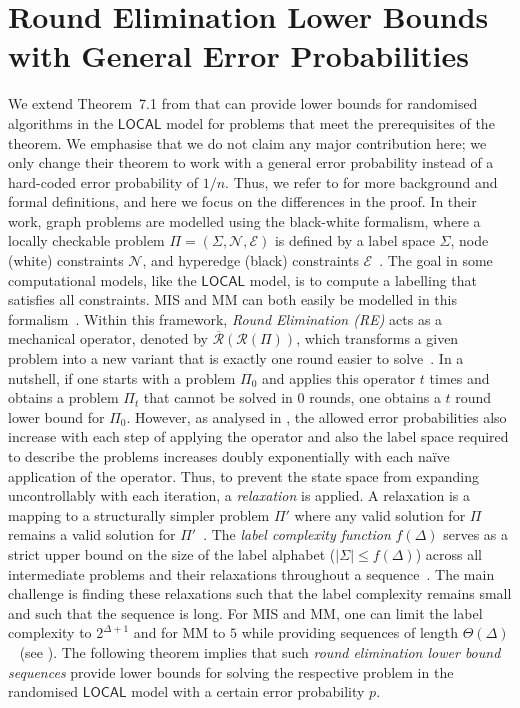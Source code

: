 \documentclass[letterpaper,11pt]{article}
\newcommand{\1}{\mathbb I}
\newcommand{\LOCAL}{\ensuremath{\mathsf{LOCAL}}\xspace}
\begin{document}
\section{Round Elimination Lower Bounds with General Error Probabilities}\label{sec:sevenOne}
%
We extend Theorem~7.1 from \cite{BBKO22} that can provide lower bounds for randomised algorithms in the \LOCAL model for problems that meet the prerequisites of the theorem. We emphasise that we do not claim any major contribution here; we only change their theorem to work with a general error probability instead of a hard-coded error probability of $1/n$. Thus, we refer to \cite{BBKO22} for more background and formal definitions, and here we focus on the differences in the proof. In their work, graph problems are modelled using the black-white formalism, where a locally checkable problem $\Pi = (\Sigma, \mathcal{N}, \mathcal{E})$ is defined by a label space $\Sigma$, node (white) constraints $\mathcal{N}$, and hyperedge (black) constraints $\mathcal{E}$~\cite{BBKO22}.
The goal in some computational models, like the \LOCAL model, is to compute a labelling that satisfies all constraints. MIS and MM can both easily be modelled in this formalism~\Cite{BBKO22,BO20}. 
 Within this framework, \textit{Round Elimination (RE)} acts as a mechanical operator, denoted by $\overline{\mathcal{R}}(\mathcal{R}(\Pi))$, which transforms a given problem into a new variant that is exactly one round easier to solve~\cite{BBKO22}. In a nutshell, if one starts with a problem $\Pi_0$ and applies this operator $t$ times and obtains a problem $\Pi_t$ that cannot be solved in $0$ rounds, one obtains a $t$ round lower bound for $\Pi_0$. However, as analysed in \cite{BBKO22}, the allowed error probabilities also increase with each step of applying the operator and also the label space required to describe the problems increases doubly exponentially with each naïve application of the operator. Thus, to prevent the state space from expanding uncontrollably with each iteration, a \textit{relaxation} is applied. A relaxation is a mapping to a structurally simpler problem $\Pi'$ where any valid solution for $\Pi$ remains a valid solution for $\Pi'$~\cite{BBKO22}. The \textit{label complexity function} $f(\Delta)$ serves as a strict upper bound on the size of the label alphabet ($|\Sigma| \le f(\Delta)$) across all intermediate problems and their relaxations throughout a sequence~\cite{BBKO22}. The main challenge is finding these relaxations such that the label complexity remains small and such that the sequence is long. For MIS and MM, one can limit the label complexity to $2^{\Delta+1}$ and for MM to $5$ while providing sequences of length $\Theta(\Delta)$~\cite{BBKO22,BO20} (see ). The following theorem implies that such \emph{round elimination lower bound sequences} provide lower bounds for solving the respective problem in the  randomised \LOCAL model with a certain error probability $p$.
\end{document}
